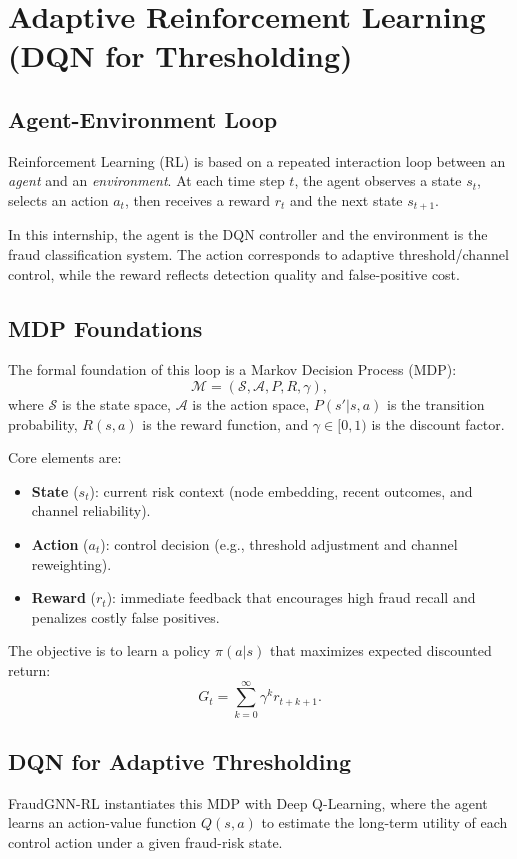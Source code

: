 \documentclass[12pt,a4paper]{report}
\begin{document}
\section{Adaptive Reinforcement Learning (DQN for Thresholding)}
\subsection{Agent-Environment Loop}
Reinforcement Learning (RL) is based on a repeated interaction loop between an \emph{agent} and an \emph{environment}. At each time step $t$, the agent observes a state $s_t$, selects an action $a_t$, then receives a reward $r_t$ and the next state $s_{t+1}$.

In this internship, the agent is the DQN controller and the environment is the fraud classification system. The action corresponds to adaptive threshold/channel control, while the reward reflects detection quality and false-positive cost.

\subsection{MDP Foundations}
The formal foundation of this loop is a Markov Decision Process (MDP):
\[
\mathcal{M}=(\mathcal{S},\mathcal{A},P,R,\gamma),
\]
where $\mathcal{S}$ is the state space, $\mathcal{A}$ is the action space, $P(s'|s,a)$ is the transition probability, $R(s,a)$ is the reward function, and $\gamma\in[0,1)$ is the discount factor.

Core elements are:
\begin{itemize}
    \item \textbf{State} ($s_t$): current risk context (node embedding, recent outcomes, and channel reliability).
    \item \textbf{Action} ($a_t$): control decision (e.g., threshold adjustment and channel reweighting).
    \item \textbf{Reward} ($r_t$): immediate feedback that encourages high fraud recall and penalizes costly false positives.
\end{itemize}
The objective is to learn a policy $\pi(a|s)$ that maximizes expected discounted return:
\[
G_t=\sum_{k=0}^{\infty}\gamma^k r_{t+k+1}.
\]

\subsection{DQN for Adaptive Thresholding}
FraudGNN-RL instantiates this MDP with Deep Q-Learning, where the agent learns an action-value function $Q(s,a)$ to estimate the long-term utility of each control action under a given fraud-risk state.
\end{document}
